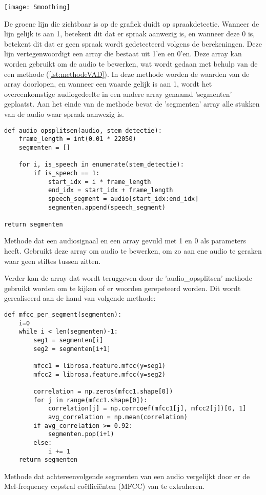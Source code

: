 \begin{center}
    \texttt{[image: Smoothing]}
    \label{fig:smoothing}
\end{center}
De groene lijn die zichtbaar is op de grafiek duidt op spraakdetectie. Wanneer de lijn gelijk is aan 1, betekent dit dat er spraak aanwezig is, en wanneer deze 0 is, betekent dit dat er geen spraak wordt gedetecteerd volgens de berekeningen. Deze lijn vertegenwoordigt een array die bestaat uit 1'en en 0'en. Deze array kan worden gebruikt om de audio te bewerken, wat wordt gedaan met behulp van de een methode (\ref{lst:methodeVAD}). In deze methode worden de waarden van de array doorlopen, en wanneer een waarde gelijk is aan 1, wordt het overeenkomstige audiogedeelte in een andere array genaamd 'segmenten' geplaatst. Aan het einde van de methode bevat de 'segmenten' array alle stukken van de audio waar spraak aanwezig is.
\begin{listing}[H]
    \begin{verbatim}
def audio_opsplitsen(audio, stem_detectie):
    frame_length = int(0.01 * 22050)
    segmenten = []
    
    for i, is_speech in enumerate(stem_detectie):
        if is_speech == 1:
            start_idx = i * frame_length
            end_idx = start_idx + frame_length
            speech_segment = audio[start_idx:end_idx]
            segmenten.append(speech_segment)
        
return segmenten
\end{verbatim}
    \caption{Methode dat een audiosignaal en een array gevuld met 1 en 0 als parameters heeft. Gebruikt deze array om audio te bewerken, om zo aan ene audio te geraken waar geen stiltes tussen zitten.}
\label{lst:methodeVAD}
\end{listing}
Verder kan de array dat wordt teruggeven door de 'audio\_opsplitsen' methode gebruikt worden om te kijken of er woorden gerepeteerd worden. Dit wordt gerealiseerd aan de hand van volgende methode:
\begin{listing}[H]
    \begin{verbatim}
def mfcc_per_segment(segmenten):
    i=0
    while i < len(segmenten)-1:
        seg1 = segmenten[i]
        seg2 = segmenten[i+1]
        
        mfcc1 = librosa.feature.mfcc(y=seg1)
        mfcc2 = librosa.feature.mfcc(y=seg2)

        correlation = np.zeros(mfcc1.shape[0])
        for j in range(mfcc1.shape[0]):
            correlation[j] = np.corrcoef(mfcc1[j], mfcc2[j])[0, 1]
            avg_correlation = np.mean(correlation)
        if avg_correlation >= 0.92:
            segmenten.pop(i+1)
        else:
            i += 1
    return segmenten
    \end{verbatim}
    \caption{Methode dat achtereenvolgende segmenten van een audio vergelijkt door er de Mel-frequency cepstral coëfficiënten (MFCC) van te extraheren.}
    \label{lst:vglMFCC}
\end{listing}
